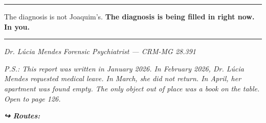 \vspace{0.5em}\noindent\rule{\textwidth}{0.5pt}\vspace{0.5em}

\noindent The diagnosis is not Joaquim's.
\textbf{The diagnosis is being filled in right now.}
\textbf{In you.}

\vspace{0.5em}\noindent\rule{\textwidth}{0.5pt}\vspace{0.5em}

\noindent \textit{Dr. Lúcia Mendes}
\textit{Forensic Psychiatrist --- CRM-MG 28.391}

\noindent \textit{P.S.: This report was written in January 2026. In February 2026, Dr. Lúcia Mendes requested medical leave. In March, she did not return. In April, her apartment was found empty. The only object out of place was a book on the table. Open to page 126.}

\vspace{0.5em}
\noindent\textit{\textbf{↪ Routes:}  \rotasep {}}
